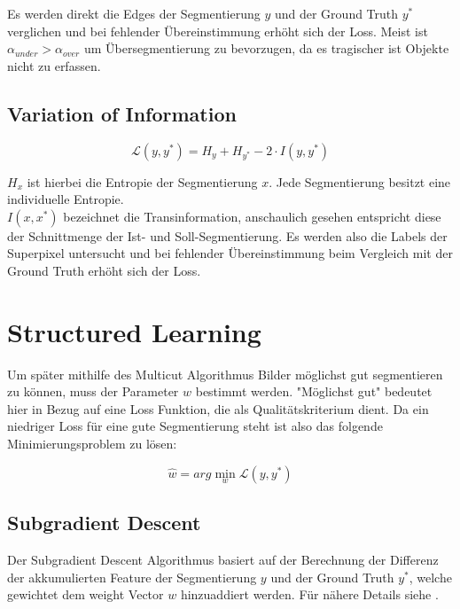 Es werden direkt die Edges der Segmentierung $y$ und der Ground Truth $y^*$ verglichen und bei fehlender Übereinstimmung erhöht sich der Loss. Meist ist $\alpha_{under} > \alpha_{over}$ um Übersegmentierung zu bevorzugen, da es tragischer ist Objekte nicht zu erfassen.

\subsection{Variation of Information}\label{sec:voi}

\begin{equation}
\mathcal{L}(y, y^*) = H_y + H_{y^*} - 2 \cdot I(y, y^*)
\end{equation}

$H_x$ ist hierbei die Entropie der Segmentierung $x$. Jede Segmentierung besitzt eine individuelle Entropie.  \\
$I(x, x^*)$ bezeichnet die Transinformation, anschaulich gesehen entspricht diese der Schnittmenge der Ist- und Soll-Segmentierung. 
Es werden also die Labels der Superpixel untersucht und bei fehlender Übereinstimmung beim Vergleich mit der Ground Truth erhöht sich der Loss.

\section{Structured Learning}\label{sec:strucLearn}

Um später mithilfe des Multicut Algorithmus Bilder möglichst gut segmentieren zu können, muss der Parameter $w$ bestimmt werden. "Möglichst gut" bedeutet hier in Bezug auf eine Loss Funktion, die als Qualitätskriterium dient. Da ein niedriger Loss für eine gute Segmentierung steht ist also das folgende Minimierungsproblem zu lösen:

\begin{equation}
\hat{w} = arg\min_{w} \mathcal{L}(y, y^*)
\end{equation}

\subsection{Subgradient Descent}

Der Subgradient Descent Algorithmus basiert auf der Berechnung der Differenz der akkumulierten Feature der Segmentierung $y$ und der Ground Truth $y^*$, welche gewichtet dem weight Vector $w$ hinzuaddiert werden. Für nähere Details siehe \cite{NowozinStrucLearn11}.

